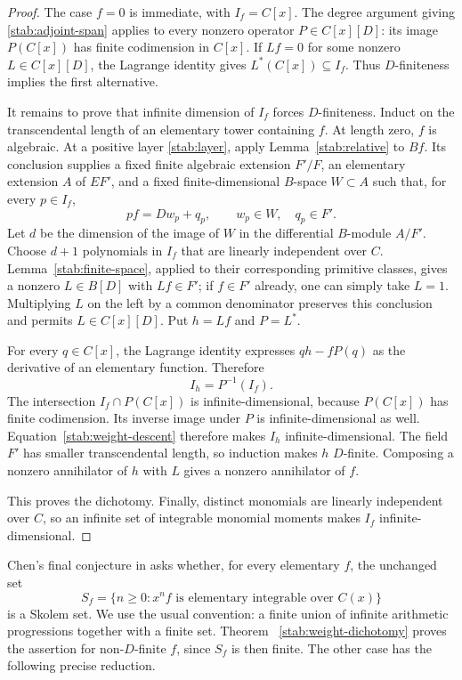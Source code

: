 \documentclass[11pt,a4paper]{article}
\theoremstyle{definition}
\theoremstyle{remark}
\numberwithin{equation}{section}
\begin{document}
\begin{proof}
The case $f=0$ is immediate, with $I_f=C[x]$.
The degree argument giving \eqref{stab:adjoint-span} applies to every
nonzero operator $P\in C[x][D]$: its image $P(C[x])$ has finite
codimension in $C[x]$.  If $Lf=0$ for some nonzero
$L\in C[x][D]$, the Lagrange identity gives
$L^*(C[x])\subseteq I_f$.  Thus $D$-finiteness implies the first
alternative.

It remains to prove that infinite dimension of $I_f$ forces
$D$-finiteness.  Induct on the transcendental length of an elementary
tower containing $f$.  At length zero, $f$ is algebraic.  At a positive
layer \eqref{stab:layer}, apply Lemma~\ref{stab:relative} to $Bf$.
Its conclusion supplies a fixed finite algebraic extension $F'/F$,
an elementary extension $A$ of $EF'$, and a fixed finite-dimensional
$B$-space $W\subset A$ such that, for every $p\in I_f$,
\[
 pf=Dw_p+q_p,\qquad w_p\in W,\quad q_p\in F'.
\]
Let $d$ be the dimension of the image of $W$ in the differential
$B$-module $A/F'$.  Choose $d+1$ polynomials in $I_f$ that are
linearly independent over $C$.  Lemma~\ref{stab:finite-space}, applied
to their corresponding primitive classes, gives a nonzero
$L\in B[D]$ with $Lf\in F'$; if $f\in F'$ already, one can simply
take $L=1$.  Multiplying $L$ on the left by a common denominator
preserves this conclusion and permits $L\in C[x][D]$.
Put $h=Lf$ and $P=L^*$.

For every $q\in C[x]$, the Lagrange identity expresses $qh-fP(q)$
as the derivative of an elementary function.  Therefore
\begin{equation}\label{stab:weight-descent}
 I_h=P^{-1}(I_f).
\end{equation}
The intersection $I_f\cap P(C[x])$ is infinite-dimensional, because
$P(C[x])$ has finite codimension.  Its inverse image under $P$ is
infinite-dimensional as well.  Equation~\eqref{stab:weight-descent}
therefore makes $I_h$ infinite-dimensional.  The field $F'$ has smaller
transcendental length, so induction makes $h$ $D$-finite.  Composing a
nonzero annihilator of $h$ with $L$ gives a nonzero annihilator of $f$.

This proves the dichotomy.  Finally, distinct monomials are linearly
independent over $C$, so an infinite set of integrable monomial moments
makes $I_f$ infinite-dimensional.
\end{proof}

Chen's final conjecture in \cite[Section~5]{stab:Chen} asks whether,
for every elementary $f$, the unchanged set
\[
 S_f=\{n\geq0:x^nf\text{ is elementary integrable over }C(x)\}
\]
is a Skolem set.  We use the usual convention: a finite union of
infinite arithmetic progressions together with a finite set.  Theorem~
\ref{stab:weight-dichotomy} proves the assertion for non-$D$-finite
$f$, since $S_f$ is then finite.  The other case has the following
precise reduction.
\end{document}
